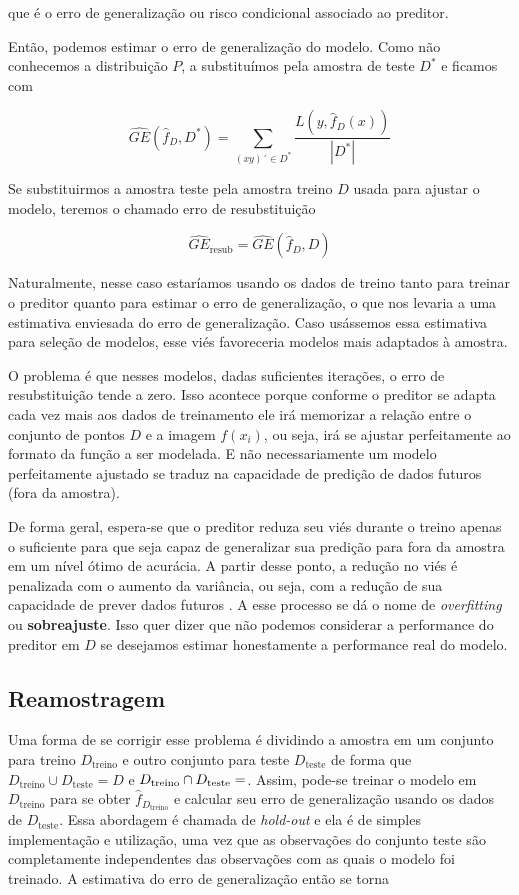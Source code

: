 \documentclass[
  12pt,
  oneside,
  a4paper,
  chapter=TITLE,
  section=TITLE,
  brazil]{abntex2}
\begin{document}
que é o erro de generalização ou risco condicional associado ao
preditor.

Então, podemos estimar o erro de generalização do modelo. Como não
conhecemos a distribuição \(P\), a substituímos pela amostra de teste
\(D^*\) e ficamos com

\[\widehat{GE}(\hat{f}_D, D^*) = \sum_{(xy)´ \in D^*} \frac{L(y, \hat{f}_D(x))}{|D^*|}\]

Se substituirmos a amostra teste pela amostra treino \(D\) usada para
ajustar o modelo, teremos o chamado erro de resubstituição

\[\widehat{GE}_\text{resub} = \widehat{GE}(\hat{f}_D, D)\]

Naturalmente, nesse caso estaríamos usando os dados de treino tanto para
treinar o preditor quanto para estimar o erro de generalização, o que
nos levaria a uma estimativa enviesada do erro de generalização. Caso
usássemos essa estimativa para seleção de modelos, esse viés favoreceria
modelos mais adaptados à amostra.

O problema é que nesses modelos, dadas suficientes iterações, o erro de
resubstituição tende a zero. Isso acontece porque conforme o preditor se
adapta cada vez mais aos dados de treinamento ele irá memorizar a
relação entre o conjunto de pontos \(D\) e a imagem \(f(x_i)\), ou seja,
irá se ajustar perfeitamente ao formato da função a ser modelada. E não
necessariamente um modelo perfeitamente ajustado se traduz na capacidade
de predição de dados futuros (fora da amostra).

De forma geral, espera-se que o preditor reduza seu viés durante o
treino apenas o suficiente para que seja capaz de generalizar sua
predição para fora da amostra em um nível ótimo de acurácia. A partir
desse ponto, a redução no viés é penalizada com o aumento da variância,
ou seja, com a redução de sua capacidade de prever dados futuros
\autocite{bischl_resampling_2012}. A esse processo se dá o nome de
\emph{overfitting} ou \textbf{sobreajuste}. Isso quer dizer que não
podemos considerar a performance do preditor em \(D\) se desejamos
estimar honestamente a performance real do modelo.

\hypertarget{reamostragem}{%
\subsection{Reamostragem}\label{reamostragem}}

Uma forma de se corrigir esse problema é dividindo a amostra em um
conjunto para treino \(D_\text{treino}\) e outro conjunto para teste
\(D_\text{teste}\) de forma que
\(D_\text{treino} \cup D_\text{teste} = D\) e
\(D_\text{treino} \cap D_\text{teste} = \empty\). Assim, pode-se treinar
o modelo em \(D_\text{treino}\) para se obter
\(\hat{f}_{D_{\text{treino}}}\) e calcular seu erro de generalização
usando os dados de \(D_\text{teste}\). Essa abordagem é chamada de
\emph{hold-out} e ela é de simples implementação e utilização, uma vez
que as observações do conjunto teste são completamente independentes das
observações com as quais o modelo foi treinado. A estimativa do erro de
generalização então se torna
\end{document}
